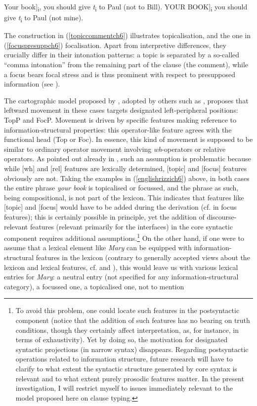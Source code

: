 \ea \label{englishrizzich6}
\ea {[}Your book]\textsubscript{i}, you should give \textit{t}\textsubscript{i} to Paul (not to Bill). \label{topiccommentch6}
\ex {[}YOUR BOOK]\textsubscript{i} you should give \textit{t}\textsubscript{i} to Paul (not mine). \label{focuspresuppch6}
\z
\z

The construction in (\ref{topiccommentch6}) illustrates topicalisation, and the one in (\ref{focuspresuppch6}) focalisation. Apart from interpretive differences, they crucially differ in their intonation patterns: a topic is separated by a so-called ``comma intonation'' from the remaining part of the clause (the comment), while a focus bears focal stress and is thus prominent with respect to presupposed information (see \citealt[258]{rizzi1997}).

The cartographic model proposed by \citet{rizzi1997}, adopted by others such as \citet{poletto2006}, proposes that leftward movement in these cases targets designated left-peripheral positions: TopP and FocP. Movement is driven by specific features making reference to information-structural properties: this operator-like feature agrees with the functional head (Top or Foc). In essence, this kind of movement is supposed to be similar to ordinary operator movement involving \textit{wh}-operators or relative operators. As pointed out already in , such an assumption is problematic because while [wh] and [rel] features are lexically determined, [topic] and [focus] features obviously are not. Taking the examples in (\ref{englishrizzich6}) above, in both cases the entire phrase \textit{your book} is topicalised or focussed, and the phrase as such, being compositional, is not part of the lexicon. This indicates that features like [topic] and [focus] would have to be added during the derivation (cf. \citealt{selkirk1984} in focus features); this is certainly possible in principle, yet the addition of discourse-relevant features (relevant primarily for the interfaces) in the core syntactic component requires additional assumptions.\footnote{To avoid this problem, one could locate such features in the postsyntactic component (notice that the addition of such features has no bearing on truth conditions, though they certainly affect interpretation, as, for instance, in terms of exhaustivity). Yet by doing so, the motivation for designated syntactic projections (in narrow syntax) disappears. Regarding postsyntactic operations related to information structure, future research will have to clarify to what extent the syntactic structure generated by core syntax is relevant and to what extent purely prosodic features matter. In the present investigation, I will restrict myself to issues immediately relevant to the model proposed here on clause typing.} On the other hand, if one were to assume that a lexical element like \textit{Mary} can be equipped with information-structural features in the lexicon (contrary to generally accepted views about the lexicon and lexical features, cf. \citealt{neelemanszendroei2004} and \citealt{dendikken2006}), this would leave us with various lexical entries for \textit{Mary}: a neutral entry (not specified for any information-structural category), a focussed one, a topicalised one, not to mention 